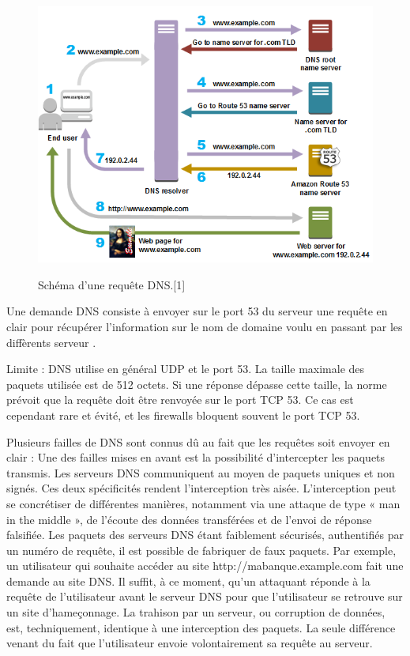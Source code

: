 \documentclass[a4paper,12pt]{article}
\begin{document}
	\begin{figure}[H]
		\begin{center}
			{\includegraphics[scale=0.5]{Images/routes-traffic.png}}
		\end{center}
		\caption{Schéma d'une requête DNS.[1]}		 
		
	\end{figure}
	
	Une demande DNS consiste à envoyer sur le port 53 du serveur une requête en clair pour récupérer l'information sur le nom de domaine voulu en passant par les diffèrents serveur .
	
	Limite :
	DNS utilise en général UDP et le port 53. La taille maximale des paquets utilisée est de 512 octets. Si une réponse dépasse cette taille, la norme prévoit que la requête doit être renvoyée sur le port TCP 53. Ce cas est cependant rare et évité, et les firewalls bloquent souvent le port TCP 53.
	
	Plusieurs failles de DNS sont connus dû au fait que les requêtes soit envoyer en clair : 
	Une des failles mises en avant est la possibilité d'intercepter les paquets transmis. 
	Les serveurs DNS communiquent au moyen de paquets uniques et non signés. 
	Ces deux spécificités rendent l'interception très aisée. 
	L'interception peut se concrétiser de différentes manières, notamment via une attaque de type « man in the middle », de l'écoute des données transférées et de l'envoi de réponse falsifiée.
	Les paquets des serveurs DNS étant faiblement sécurisés, authentifiés par un numéro de requête, il est possible de fabriquer de faux paquets.
	Par exemple, un utilisateur qui souhaite accéder au site http://mabanque.example.com fait une demande au site DNS.
	Il suffit, à ce moment, qu'un attaquant réponde à la requête de l'utilisateur avant le serveur DNS pour que l'utilisateur se retrouve sur un site d'hameçonnage.
	La trahison par un serveur, ou corruption de données, est, techniquement, identique à une interception des paquets.
	La seule différence venant du fait que l'utilisateur envoie volontairement sa requête au serveur. 
	
\end{document}
